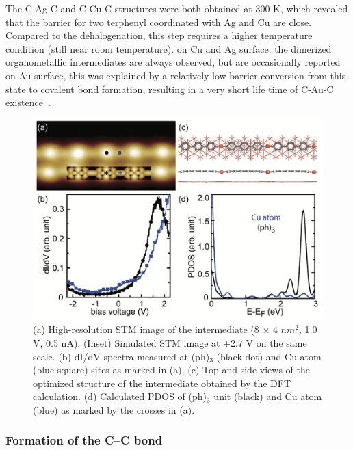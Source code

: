\documentclass[%
 reprint,
 amsmath,amssymb,
 aps,
prb,
]{revtex4-1}
\begin{document}
The C-Ag-C and C-Cu-C structures were both obtained at 300 K, which revealed that the barrier for two terphenyl
coordinated with Ag and Cu are close. Compared to the dehalogenation, this step requires a higher temperature condition (still near room temperature). on Cu and Ag surface, the dimerized organometallic intermediates are always observed, but are occasionally reported on Au surface, this was explained by a relatively low barrier conversion from this state to covalent bond formation, resulting in a very short life time of C-Au-C existence~\cite{ullmann_33}.
%
\begin{figure}[ht]
\centering
\includegraphics[width=0.75\columnwidth]{Fig/Organometallic.png}
\caption{(a) High-resolution STM image of the intermediate (8 $\times$ 4 $nm^2$, 1.0 V, 0.5 nA). (Inset) Simulated STM image at +2.7 V on the same scale. (b) dI/dV spectra measured at (ph)$_3$ (black dot) and Cu atom (blue square) sites as marked in (a). (c) Top and side views of the optimized structure of the intermediate obtained by the DFT calculation. (d) Calculated PDOS of (ph)$_3$ unit (black) and Cu atom (blue) as marked by the crosses in (a).}
\label{fig:organ}
\end{figure}

\subsubsection{Formation of the C--C bond}
\end{document}
